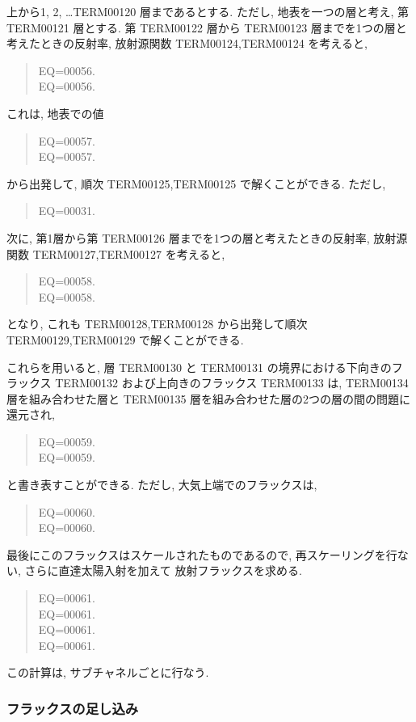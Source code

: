 上から1, 2, \ldots TERM00120 層まであるとする. 
ただし, 地表を一つの層と考え, 第 TERM00121 層とする.
第 TERM00122 層から TERM00123 層までを1つの層と考えたときの反射率, 放射源関数
TERM00124,TERM00124 を考えると,
\begin{quote}
EQ=00056.\\
EQ=00056.
\end{quote}
これは, 地表での値
\begin{quote}
EQ=00057.\\
EQ=00057.
\end{quote}
から出発して, 順次 TERM00125,TERM00125 で解くことができる.
ただし,
\begin{quote}
EQ=00031.
\end{quote}


次に, 第1層から第 TERM00126 層までを1つの層と考えたときの反射率, 放射源関数
TERM00127,TERM00127 を考えると,
\begin{quote}
EQ=00058.\\
EQ=00058.
\end{quote}
となり, これも TERM00128,TERM00128
から出発して順次 TERM00129,TERM00129 で解くことができる.

これらを用いると,
層 TERM00130 と TERM00131 の境界における下向きのフラックス TERM00132
および上向きのフラックス TERM00133 は,
TERM00134 層を組み合わせた層と
TERM00135 層を組み合わせた層の2つの層の間の問題に還元され,
\begin{quote}
EQ=00059.\\
EQ=00059.
\end{quote}
と書き表すことができる.
ただし, 大気上端でのフラックスは,
\begin{quote}
EQ=00060.\\
EQ=00060.
\end{quote}

最後にこのフラックスはスケールされたものであるので,
再スケーリングを行ない, さらに直達太陽入射を加えて
放射フラックスを求める.

\begin{quote}
EQ=00061.\\
EQ=00061.\\
EQ=00061.\\
EQ=00061.
\end{quote}

この計算は, サブチャネルごとに行なう.

\subsubsection{フラックスの足し込み}

